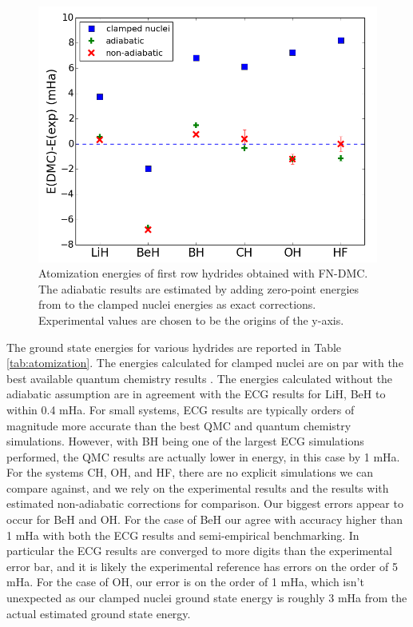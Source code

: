 \documentclass[pra,superscriptaddress,groupedaddress,twocolumn]{revtex4}
\begin{document}
\begin{figure}
\centering
\includegraphics[scale=.4]{Figures/atomization}
\caption{Atomization energies of first row hydrides obtained with FN-DMC. The adiabatic results are estimated by adding zero-point energies from \cite{Feller_Corrections} to the clamped nuclei energies as exact corrections. Experimental values are chosen to be the origins of the y-axis.}
\end{figure}

The ground state energies for various hydrides are reported in Table \ref{tab:atomization}. The energies calculated for clamped nuclei are on par with the best available quantum chemistry results \cite{Adamowicz_LiH,Koput_BeH,Miliordos_BH}. The energies calculated without the adiabatic assumption are in agreement with the ECG results for LiH, BeH to within 0.4 mHa. For small systems, ECG results are typically orders of magnitude more accurate than the best QMC and quantum chemistry simulations. However, with BH being one of the largest ECG simulations performed, the QMC results are actually lower in energy, in this case by 1 mHa. For the systems CH, OH, and HF, there are no explicit simulations we can compare against, and we rely on the experimental results and the results with estimated non-adiabatic corrections for comparison. Our biggest errors appear to occur for BeH and OH.   For the case of BeH our agree with accuracy higher than 1 mHa with both the ECG results and semi-empirical benchmarking. In particular the ECG results are converged to more digits than the experimental error bar, and it is likely the experimental reference has errors on the order of 5 mHa.   For the case of OH, our error is on the order of 1 mHa, which isn't unexpected as our clamped nuclei ground state energy is roughly 3 mHa from the actual estimated ground state energy.
 
\end{document}
